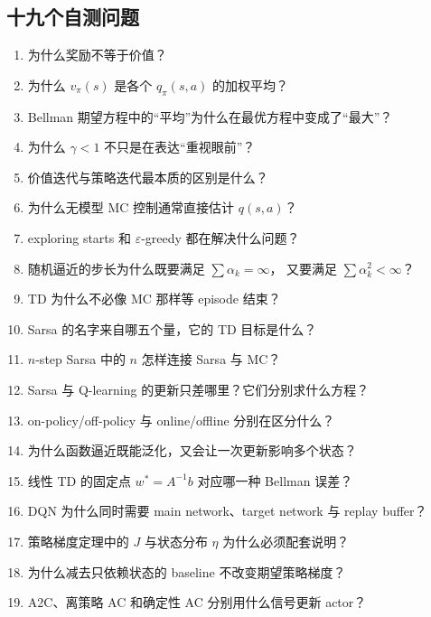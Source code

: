 \documentclass[11pt,a4paper,fontset=fandol]{ctexart}
\newcommand{\vpi}{v_{\pi}}
\newcommand{\qpi}{q_{\pi}}
\begin{document}
\subsection*{十九个自测问题}

\begin{enumerate}
  \item 为什么奖励不等于价值？
  \item 为什么 \(\vpi(s)\) 是各个 \(\qpi(s,a)\) 的加权平均？
  \item Bellman 期望方程中的“平均”为什么在最优方程中变成了“最大”？
  \item 为什么 \(\gamma<1\) 不只是在表达“重视眼前”？
  \item 价值迭代与策略迭代最本质的区别是什么？
  \item 为什么无模型 MC 控制通常直接估计 \(q(s,a)\)？
  \item exploring starts 和 \(\varepsilon\)-greedy 都在解决什么问题？
  \item 随机逼近的步长为什么既要满足 \(\sum\alpha_k=\infty\)，
  又要满足 \(\sum\alpha_k^2<\infty\)？
  \item TD 为什么不必像 MC 那样等 episode 结束？
  \item Sarsa 的名字来自哪五个量，它的 TD 目标是什么？
  \item \(n\)-step Sarsa 中的 \(n\) 怎样连接 Sarsa 与 MC？
  \item Sarsa 与 Q-learning 的更新只差哪里？它们分别求什么方程？
  \item on-policy/off-policy 与 online/offline 分别在区分什么？
  \item 为什么函数逼近既能泛化，又会让一次更新影响多个状态？
  \item 线性 TD 的固定点 \(w^*=A^{-1}b\) 对应哪一种 Bellman 误差？
  \item DQN 为什么同时需要 main network、target network 与 replay buffer？
  \item 策略梯度定理中的 \(J\) 与状态分布 \(\eta\) 为什么必须配套说明？
  \item 为什么减去只依赖状态的 baseline 不改变期望策略梯度？
  \item A2C、离策略 AC 和确定性 AC 分别用什么信号更新 actor？
\end{enumerate}
\end{document}
